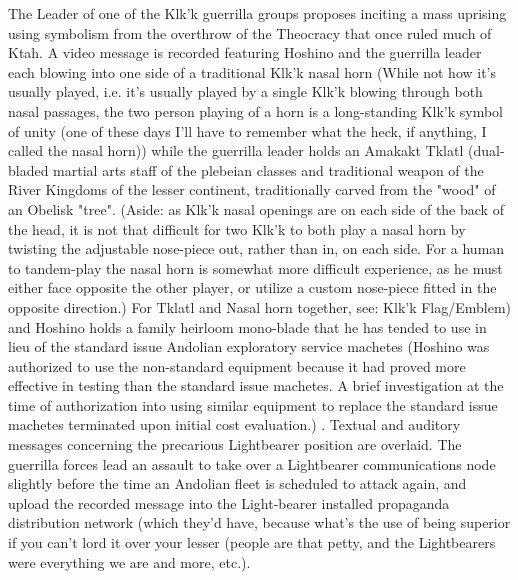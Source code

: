 \begin{itemize}
The Leader of one of the Klk'k guerrilla groups proposes inciting a
mass uprising using symbolism from the overthrow of the Theocracy that
once ruled much of Ktah. A video message is recorded featuring Hoshino
and the guerrilla leader each blowing into one side of a traditional
Klk'k nasal horn (While not how it's usually played, i.e. it's usually
played by a single Klk'k blowing through both nasal passages, the two
person playing of a horn is a long-standing Klk'k symbol of unity (one
of these days I'll have to remember what the heck, if anything, I
called the nasal horn)) while the guerrilla leader holds an Amakakt
Tklatl (dual-bladed martial arts staff of the plebeian classes and
traditional weapon of the River Kingdoms of the lesser continent,
traditionally carved from the "wood" of an Obelisk "tree". (Aside: as
Klk'k nasal openings are on each side of the back of the head, it is
not that difficult for two Klk'k to both play a nasal horn by twisting
the adjustable nose-piece out, rather than in, on each side. For a
human to tandem-play the nasal horn is somewhat more difficult
experience, as he must either face opposite the other player, or
utilize a custom nose-piece fitted in the opposite direction.) For
Tklatl and Nasal horn together, see: Klk'k Flag/Emblem) and Hoshino
holds a family heirloom mono-blade that he has tended to use in lieu
of the standard issue Andolian exploratory service machetes (Hoshino
was authorized to use the non-standard equipment because it had proved
more effective in testing than the standard issue machetes. A brief
investigation at the time of authorization into using similar
equipment to replace the standard issue machetes terminated upon
initial cost evaluation.) . Textual and auditory messages concerning
the precarious Lightbearer position are overlaid. The guerrilla forces
lead an assault to take over a Lightbearer communications node
slightly before the time an Andolian fleet is scheduled to attack
again, and upload the recorded message into the Light-bearer installed
propaganda distribution network (which they'd have, because what's the
use of being superior if you can't lord it over your lesser (people
are that petty, and the Lightbearers were everything we are and more,
etc.). 


\end{itemize}
